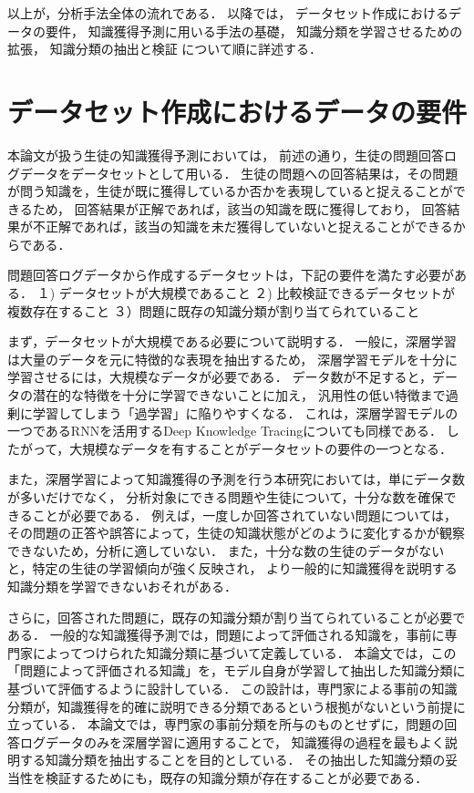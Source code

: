 以上が，分析手法全体の流れである．
以降では，
データセット作成におけるデータの要件，
知識獲得予測に用いる手法の基礎，
知識分類を学習させるための拡張，
知識分類の抽出と検証
について順に詳述する．


\section{データセット作成におけるデータの要件}
本論文が扱う生徒の知識獲得予測においては，
前述の通り，生徒の問題回答ログデータをデータセットとして用いる．
生徒の問題への回答結果は，その問題が問う知識を，生徒が既に獲得しているか否かを表現していると捉えることができるため，
回答結果が正解であれば，該当の知識を既に獲得しており，
回答結果が不正解であれば，該当の知識を未だ獲得していないと捉えることができるからである．

問題回答ログデータから作成するデータセットは，下記の要件を満たす必要がある．
１) データセットが大規模であること
２) 比較検証できるデータセットが複数存在すること
３）問題に既存の知識分類が割り当てられていること

まず，データセットが大規模である必要について説明する．
一般に，深層学習は大量のデータを元に特徴的な表現を抽出するため，
深層学習モデルを十分に学習させるには，大規模なデータが必要である．
データ数が不足すると，データの潜在的な特徴を十分に学習できないことに加え，
汎用性の低い特徴まで過剰に学習してしまう「過学習」に陥りやすくなる．
これは，深層学習モデルの一つであるRNNを活用するDeep Knowledge Tracingについても同様である\cite{piech2015deep}．
したがって，大規模なデータを有することがデータセットの要件の一つとなる．


また，深層学習によって知識獲得の予測を行う本研究においては，単にデータ数が多いだけでなく，
分析対象にできる問題や生徒について，十分な数を確保できることが必要である．
例えば，一度しか回答されていない問題については，
その問題の正答や誤答によって，生徒の知識状態がどのように変化するかが観察できないため，分析に適していない．
また，十分な数の生徒のデータがないと，特定の生徒の学習傾向が強く反映され，
より一般的に知識獲得を説明する知識分類を学習できないおそれがある．


さらに，回答された問題に，既存の知識分類が割り当てられていることが必要である．
一般的な知識獲得予測では，問題によって評価される知識を，事前に専門家によってつけられた知識分類に基づいて定義している．
本論文では，この「問題によって評価される知識」を，モデル自身が学習して抽出した知識分類に基づいて評価するように設計している．
この設計は，専門家による事前の知識分類が，知識獲得を的確に説明できる分類であるという根拠がないという前提に立っている．
本論文では，専門家の事前分類を所与のものとせずに，問題の回答ログデータのみを深層学習に適用することで，
知識獲得の過程を最もよく説明する知識分類を抽出することを目的としている．
その抽出した知識分類の妥当性を検証するためにも，既存の知識分類が存在することが必要である．



